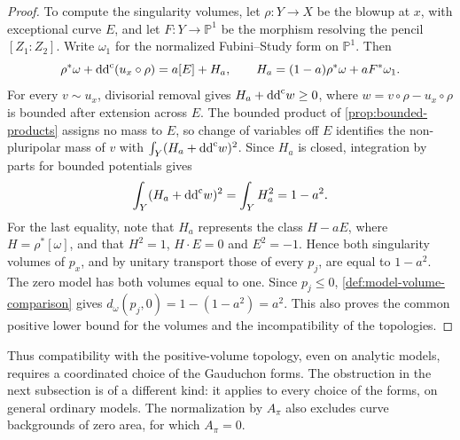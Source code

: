 \begin{proof}
To compute the singularity volumes, let $\rho\colon Y\to X$ be the blowup at $x$, with exceptional curve $E$, and let $F\colon Y\to\mathbb P^1$ be the morphism resolving the pencil $[Z_1:Z_2]$. Write $\omega_1$ for the normalized Fubini--Study form on $\mathbb P^1$. Then
\[
 \rho^*\omega+\mathrm{dd}^{\mathrm{c}}(u_x\circ\rho)=a[E]+H_a,
 \qquad H_a=(1-a)\rho^*\omega+aF^*\omega_1.
\]
For every $v\sim u_x$, divisorial removal gives $H_a+\mathrm{dd}^{\mathrm{c}} w\geq0$, where $w=v\circ\rho-u_x\circ\rho$ is bounded after extension across $E$. The bounded product of \cref{prop:bounded-products} assigns no mass to $E$, so change of variables off $E$ identifies the non-pluripolar mass of $v$ with $\int_Y(H_a+\mathrm{dd}^{\mathrm{c}} w)^2$. Since $H_a$ is closed, integration by parts for bounded potentials gives
\[
 \int_Y(H_a+\mathrm{dd}^{\mathrm{c}} w)^2=\int_YH_a^2=1-a^2.
\]
For the last equality, note that $H_a$ represents the class $H-aE$, where $H=\rho^*[\omega]$, and that $H^2=1$, $H\cdot E=0$ and $E^2=-1$. Hence both singularity volumes of $p_x$, and by unitary transport those of every $p_j$, are equal to $1-a^2$. The zero model has both volumes equal to one. Since $p_j\leq0$, \cref{def:model-volume-comparison} gives $d_\omega(p_j,0)=1-(1-a^2)=a^2$. This also proves the common positive lower bound for the volumes and the incompatibility of the topologies.
\end{proof}

Thus compatibility with the positive-volume topology, even on analytic models, requires a coordinated choice of the Gauduchon forms. The obstruction in the next subsection is of a different kind: it applies to every choice of the forms, on general ordinary models. The normalization by $A_\pi$ also excludes curve backgrounds of zero area, for which $A_\pi=0$.


